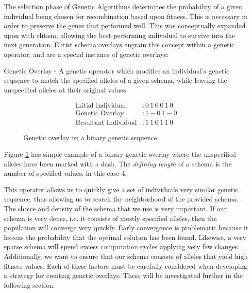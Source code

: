 The selection phase of Genetic Algorithms determines the probability of a given individual being chosen for recombination based upon fitness. This is necessary in order to preserve the genes that performed well. This was conceptually expanded upon with elitism, allowing the best performing individual to survive into the next generation. Elitist schema overlays engrain this concept within a genetic operator, and are a special instance of genetic overlays:

\begin{overlay}
Genetic Overlay - A genetic operator which modifies an individual's genetic sequence to match the specified alleles of a given schema, while leaving the unspecified alleles at their original values. 
\end{overlay}

\begin{figure}[h!]
\centering 
\begin{align*}
\text{Initial Individual} &: 0~1~0~0~1~0 		\\
\text{Genetic Overlay} &: 1-0~1-0				\\
\text{Resultant Individual} &: 1~1~0~1~1~0			
\end{align*}

\caption{Genetic overlay on a binary genetic sequence}
\label{GO-Fig}
\end{figure}

Figure-\ref{GO-Fig} has simple example of a binary genetic overlay where the unspecified alleles have been marked with a dash. The \emph{defining length} of a schema is the number of specified values, in this case $4$.

This operator allows us to quickly give a set of individuals very similar genetic sequence, thus allowing us to search the neighborhood of the provided schema. The choice and density of the schema that we use is very important. If our schema is very dense, i.e. it consists of mostly specified alleles, then the population will converge very quickly. Early convergence is problematic because it lessens the probability that the optimal solution has been found\cite{Deb99}. Likewise, a very sparse schema will spend excess computation cycles applying very few changes. Additionally, we want to ensure that our schema consists of alleles that yield high fitness values. Each of these factors must be carefully considered when developing a strategy for creating genetic overlays. These will be investigated further in the following section.

